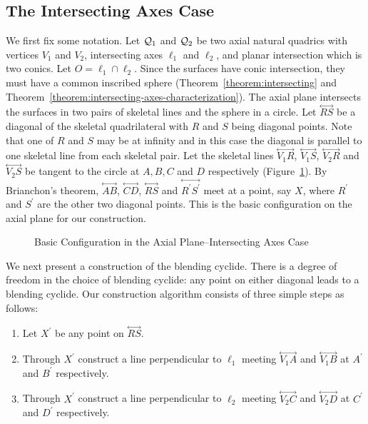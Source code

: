 
\subsection{The Intersecting Axes Case}
\label{section:intersecting-axes}

     We first fix some notation.
Let ${\cal Q}_1$ and ${\cal Q}_2$ be two axial natural quadrics with
vertices $V_1$ and $V_2$, intersecting axes $\ell_1$ and $\ell_2$, and
planar intersection which is two conics.  Let $O=\ell_1\cap\ell_2$.  
Since the surfaces have conic intersection, they must 
have a common inscribed sphere 
(Theorem~\ref{theorem:intersecting} and 
Theorem~\ref{theorem:intersecting-axes-characterization}).
The axial plane intersects the surfaces in 
two pairs of skeletal lines and the sphere in a circle.
Let $\stackrel{\longleftrightarrow}{RS}$ be a diagonal of the skeletal 
quadrilateral with $R$ and $S$ being diagonal points.  Note that one of
$R$ and $S$ may be at infinity and in this case the diagonal is parallel to
one skeletal line from each skeletal pair.  Let the skeletal lines
$\stackrel{\longleftrightarrow}{V_1R}$, $\stackrel{\longleftrightarrow}{V_1S}$,
$\stackrel{\longleftrightarrow}{V_2R}$ and 
$\stackrel{\longleftrightarrow}{V_2S}$ be tangent to the circle at $A, B, C$ 
and $D$ respectively (Figure~\ref{fig:int-config}).  By Brianchon's theorem, 
$\stackrel{\longleftrightarrow}{AB}$, $\stackrel{\longleftrightarrow}{CD}$,
$\stackrel{\longleftrightarrow}{RS}$ and
$\stackrel{\longleftrightarrow}{R^\prime S^\prime}$ meet at a point, say $X$,
where $R^\prime$ and $S^\prime$ are the other two diagonal points.
This is the basic configuration on the axial plane for our construction.
\begin{figure}
\vspace{6.5cm}
\caption{Basic Configuration in the Axial Plane--Intersecting Axes Case}
\label{fig:int-config}
\end{figure}

     We next present a construction of the blending cyclide.  There is a 
degree of freedom in the choice of blending cyclide: any point on either
diagonal leads to a blending cyclide.  Our construction algorithm consists 
of three simple steps as follows:
\begin{enumerate}
     \item Let $X^\prime$ be any point on $\stackrel{\longleftrightarrow}{RS}$.
     \item Through $X^\prime$ construct a line perpendicular to $\ell_1$ 
          meeting $\stackrel{\longleftrightarrow}{V_1A}$ and
          $\stackrel{\longleftrightarrow}{V_1B}$ at $A^\prime$ and $B^\prime$
          respectively.
     \item Through $X^\prime$ construct a line perpendicular to $\ell_2$ 
          meeting $\stackrel{\longleftrightarrow}{V_2C}$ and
          $\stackrel{\longleftrightarrow}{V_2D}$ at $C^\prime$ and $D^\prime$
          respectively.
\end{enumerate}

